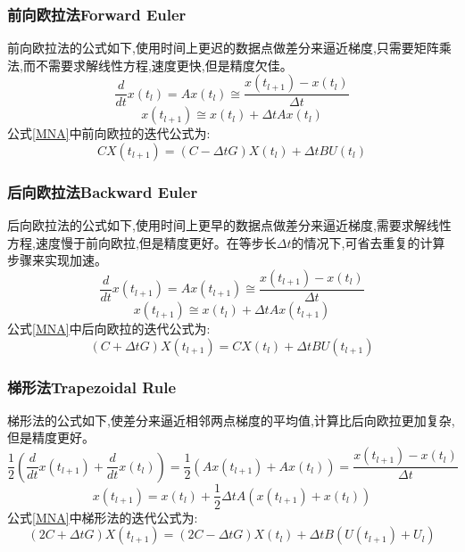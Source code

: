 \documentclass[12pt]{article}
\begin{document}
\begin{sloppypar}
\subsubsection{前向欧拉法Forward Euler}
前向欧拉法的公式如下,使用时间上更迟的数据点做差分来逼近梯度,只需要矩阵乘法,而不需要求解线性方程,速度更快,但是精度欠佳。
\begin{equation}
\frac{d}{d t} x\left(t_l\right)=A x\left(t_l\right) \cong \frac{x\left(t_{l+1}\right)-x\left(t_l\right)}{\Delta t}
\end{equation}
\begin{equation}
x\left(t_{l+1}\right) \cong x\left(t_l\right)+\Delta t A x\left(t_l\right)
\end{equation}
公式\ref{MNA}中前向欧拉的迭代公式为:
\begin{equation}
    CX(t_{l+1}) = (C-\Delta tG)X(t_{l}) + \Delta t BU(t_{l})
\end{equation}


\subsubsection{后向欧拉法Backward Euler}
后向欧拉法的公式如下,使用时间上更早的数据点做差分来逼近梯度,需要求解线性方程,速度慢于前向欧拉,但是精度更好。在等步长$\Delta t$的情况下,可省去重复的计算步骤来实现加速。
\begin{equation}
\frac{d}{d t} x\left(t_{l+1}\right)=A x\left(t_{l+1}\right) \cong \frac{x\left(t_{l+1}\right)-x\left(t_l\right)}{\Delta t}
\end{equation}
\begin{equation}
x\left(t_{l+1}\right) \cong x\left(t_l\right)+\Delta t A x\left(t_{l+1}\right)
\end{equation}
公式\ref{MNA}中后向欧拉的迭代公式为:
\begin{equation}
    (C+\Delta tG)X(t_{l+1}) = CX(t_{l}) + \Delta t BU(t_{l+1})
\end{equation}


\subsubsection{梯形法Trapezoidal Rule}
梯形法的公式如下,使差分来逼近相邻两点梯度的平均值,计算比后向欧拉更加复杂,但是精度更好。
\begin{equation}
  \frac{1}{2}\left(\frac{d}{d t} x\left(t_{l+1}\right)+\frac{d}{d t} x\left(t_l\right)\right)
  =\frac{1}{2}\left(A x\left(t_{l+1}\right)+A x\left(t_l\right)\right)
  =\frac{x\left(t_{l+1}\right)-x\left(t_l\right)}{\Delta t}
\end{equation}
\begin{equation}
  x\left(t_{l+1}\right)=x\left(t_l\right)+\frac{1}{2} \Delta t A\left(x\left(t_{l+1}\right)+x\left(t_l\right)\right)
\end{equation}
公式\ref{MNA}中梯形法的迭代公式为:
\begin{equation}
    (2C+\Delta tG)X(t_{l+1}) = (2C-\Delta tG)X(t_{l}) + \Delta t B(U(t_{l+1}) + U_{l})
\end{equation}


\end{sloppypar}
\end{document}
